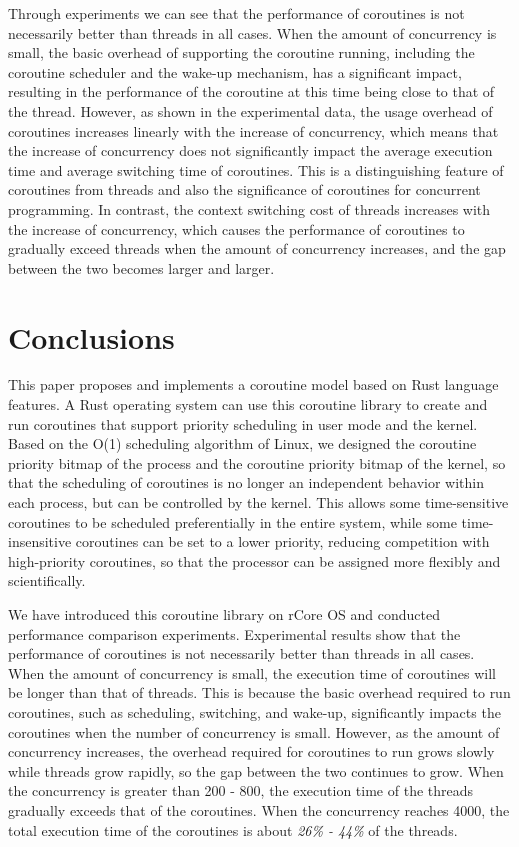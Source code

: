 \documentclass[10pt]{article}
\begin{document}
Through experiments we can see that the performance of coroutines is not necessarily better than threads in all cases. When the amount of concurrency is small, the basic overhead of supporting the coroutine running, including the coroutine scheduler and the wake-up mechanism, has a significant impact, resulting in the performance of the coroutine at this time being close to that of the thread. However, as shown in the experimental data, the usage overhead of coroutines increases linearly with the increase of concurrency, which means that the increase of concurrency does not significantly impact the average execution time and average switching time of coroutines. This is a distinguishing feature of coroutines from threads and also the significance of coroutines for concurrent programming. In contrast, the context switching cost of threads increases with the increase of concurrency, which causes the performance of coroutines to gradually exceed threads when the amount of concurrency increases, and the gap between the two becomes larger and larger.

\section{Conclusions}

This paper proposes and implements a coroutine model based on Rust language features. A Rust operating system can use this coroutine library to create and run coroutines that support priority scheduling in user mode and the kernel.  Based on the O(1) scheduling algorithm of Linux, we designed the coroutine priority bitmap of the process and the coroutine priority bitmap of the kernel, so that the scheduling of coroutines is no longer an independent behavior within each process, but can be controlled by the kernel. This allows some time-sensitive coroutines to be scheduled preferentially in the entire system, while some time-insensitive coroutines can be set to a lower priority, reducing competition with high-priority coroutines, so that the processor can be assigned more flexibly and scientifically.

We have introduced this coroutine library on rCore OS and conducted performance comparison experiments. Experimental results show that the performance of coroutines is not necessarily better than threads in all cases. When the amount of concurrency is small, the execution time of coroutines will be longer than that of threads. This is because the basic overhead required to run coroutines, such as scheduling, switching, and wake-up, significantly impacts the coroutines when the number of concurrency is small. However, as the amount of concurrency increases, the overhead required for coroutines to run grows slowly while threads grow rapidly, so the gap between the two continues to grow. When the concurrency is greater than 200 - 800, the execution time of the threads gradually exceeds that of the coroutines. When the concurrency reaches 4000, the total execution time of the coroutines is about \textit{26\% - 44\%} of the threads.
\end{document}
